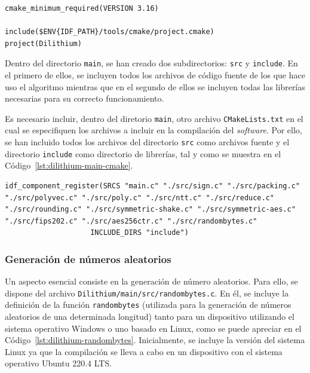 \begin{lstlisting}[label={lst:dilithium-cmake},style=Bashnice,firstnumber=1,caption={Archivo \texttt{Dilithium/CMakeLists.txt}.}]
cmake_minimum_required(VERSION 3.16)

include($ENV{IDF_PATH}/tools/cmake/project.cmake)
project(Dilithium)
\end{lstlisting}

Dentro del directorio \texttt{main}, se han creado dos subdirectorios: \texttt{src} y \texttt{include}.
En el primero de ellos, se incluyen todos los archivos de código fuente de los que hace uso el algoritmo mientras que en el segundo de ellos se incluyen todas las librerías necesarias para su correcto funcionamiento.

Es necesario incluir, dentro del diretorio \texttt{main}, otro archivo \texttt{CMakeLists.txt} en el cual se especifiquen los archivos a incluir en la compilación del \textit{software}.
Por ello, se han incluido todos los archivos del directorio \texttt{src} como archivos fuente y el directorio \texttt{include} como directorio de librerías, tal y como se muestra en el Código~\ref{lst:dilithium-main-cmake}.

\begin{lstlisting}[label={lst:dilithium-main-cmake},style=Bashnice,firstnumber=1,caption={Archivo \texttt{Dilithium/main/CMakeLists.txt}.}]
idf_component_register(SRCS "main.c" "./src/sign.c" "./src/packing.c" "./src/polyvec.c" "./src/poly.c" "./src/ntt.c" "./src/reduce.c" "./src/rounding.c" "./src/symmetric-shake.c" "./src/symmetric-aes.c" "./src/fips202.c" "./src/aes256ctr.c" "./src/randombytes.c"
                    INCLUDE_DIRS "include")
\end{lstlisting}

\subsubsection{Generación de números aleatorios}\label{subsubsec:dilithium-random}

Un aspecto esencial consiste en la generación de número aleatorios.
Para ello, se dispone del archivo \texttt{Dilithium/main/src/randombytes.c}.
En él, se incluye la definición de la función \texttt{randombytes} (utilizada para la generación de números aleatorios de una determinada longitud) tanto para un dispositivo utilizando el sistema operativo Windows o uno basado en Linux, como se puede apreciar en el Código~\ref{lst:dilithium-randombytes}.
Inicialmente, se incluye la versión del sistema Linux ya que la compilación se lleva a cabo en un dispositivo con el sistema operativo Ubuntu 220.4 LTS.

